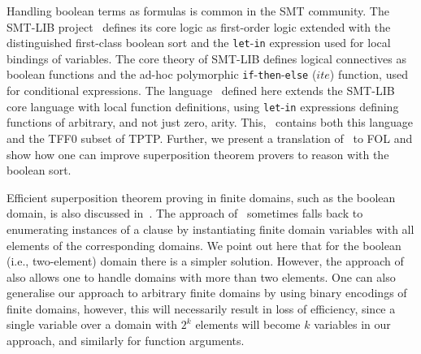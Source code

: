 Handling boolean terms as formulas is common in the SMT community. The SMT-LIB project~\cite{SMT-LIB} defines its core logic as first-order logic extended with the distinguished first-class boolean sort and the \verb'let'-\verb'in' expression used for local bindings of variables. The core theory of SMT-LIB defines logical connectives as boolean functions and the ad-hoc polymorphic \verb'if'-\verb'then'-\verb'else' ($ite$) function, used for conditional expressions. 
The language \folb\ defined here extends the SMT-LIB core language with local function definitions,
using \verb'let'-\verb'in' expressions defining functions of arbitrary, and not just zero, arity. This, \folb\ contains both this language and the TFF0 subset of TPTP. Further, we present a translation of \folb\ to FOL and show how one can improve superposition theorem provers to reason with the boolean sort. 


Efficient superposition theorem proving in finite domains, such as the boolean domain, is also discussed in~\cite{HillenbrandWeidenbach13}. The approach of~\cite{HillenbrandWeidenbach13} sometimes falls back to enumerating instances of a clause by instantiating finite domain variables with all elements of the corresponding domains. We point out here that for the boolean (i.e., two-element) domain there is a simpler solution. However, the approach of~\cite{HillenbrandWeidenbach13} also allows one to handle domains with more than two elements. One can also generalise our approach to arbitrary finite domains by using binary encodings of finite domains, however, this will necessarily result in loss of efficiency, since a single variable over a domain with $2^k$ elements will become $k$ variables in our approach, and similarly for function arguments.
